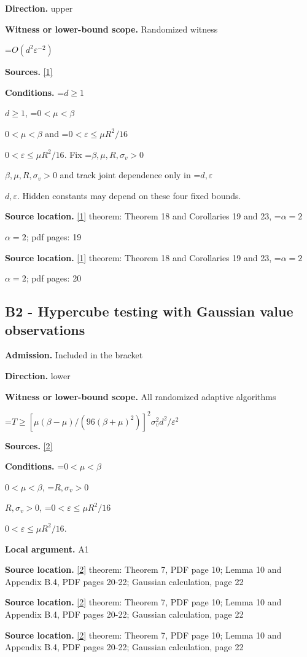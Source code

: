 \documentclass[10pt,a4paper]{article}
\newcommand{\AtlasMath}[1]{\par\begingroup\centering\setbox0=\hbox{$\displaystyle #1$}\ifdim\wd0>1.4\linewidth\typeout{ATLAS WIDE FORMULA: \the\wd0}\fi\ifdim\wd0>\linewidth\resizebox{\linewidth}{!}{\box0}\else\box0\fi\par\endgroup}
\newcommand{\AtlasInlineMath}[1]{\begingroup\setbox0=\hbox{$#1$}\ifdim\wd0>.4\linewidth\endgroup\AtlasMath{#1}\else\endgroup$#1$\fi}
\begin{document}
\textbf{Direction.} upper

\textbf{Witness or lower-bound scope.} Randomized witness

\AtlasMath{O(d^2\varepsilon^{-2})}
\textbf{Sources.} \href{https://jmlr.org/papers/volume25/23-0733/23-0733.pdf}{[1]}

\textbf{Conditions.} \AtlasInlineMath{d\ge1}, \AtlasInlineMath{0<\mu<\beta} and \AtlasInlineMath{0<\varepsilon\le\mu R^2/16}. Fix \AtlasInlineMath{\beta,\mu,R,\sigma_v>0} and track joint dependence only in \AtlasInlineMath{d,\varepsilon}. Hidden constants may depend on these four fixed bounds.

\textbf{Source location.} \href{https://jmlr.org/papers/volume25/23-0733/23-0733.pdf}{[1]} theorem: Theorem 18 and Corollaries 19 and 23, \AtlasInlineMath{\alpha=2}; pdf pages: 19

\textbf{Source location.} \href{https://jmlr.org/papers/volume25/23-0733/23-0733.pdf}{[1]} theorem: Theorem 18 and Corollaries 19 and 23, \AtlasInlineMath{\alpha=2}; pdf pages: 20

\subsection{B2 - Hypercube testing with Gaussian value observations}
\textbf{Admission.} Included in the bracket

\textbf{Direction.} lower

\textbf{Witness or lower-bound scope.} All randomized adaptive algorithms

\AtlasMath{T\ge[\mu(\beta-\mu)/(96(\beta+\mu)^2)]^2\sigma_v^2d^2/\varepsilon^2}
\textbf{Sources.} \href{https://proceedings.mlr.press/v30/Shamir13.html}{[2]}

\textbf{Conditions.} \AtlasInlineMath{0<\mu<\beta}, \AtlasInlineMath{R,\sigma_v>0}, \AtlasInlineMath{0<\varepsilon\le\mu R^2/16}.

\textbf{Local argument.} A1

\textbf{Source location.} \href{https://proceedings.mlr.press/v30/Shamir13.html}{[2]} theorem: Theorem 7, PDF page 10; Lemma 10 and Appendix B.4, PDF pages 20-22; Gaussian calculation, page 22

\textbf{Source location.} \href{https://proceedings.mlr.press/v30/Shamir13.html}{[2]} theorem: Theorem 7, PDF page 10; Lemma 10 and Appendix B.4, PDF pages 20-22; Gaussian calculation, page 22

\textbf{Source location.} \href{https://proceedings.mlr.press/v30/Shamir13.html}{[2]} theorem: Theorem 7, PDF page 10; Lemma 10 and Appendix B.4, PDF pages 20-22; Gaussian calculation, page 22
\end{document}
